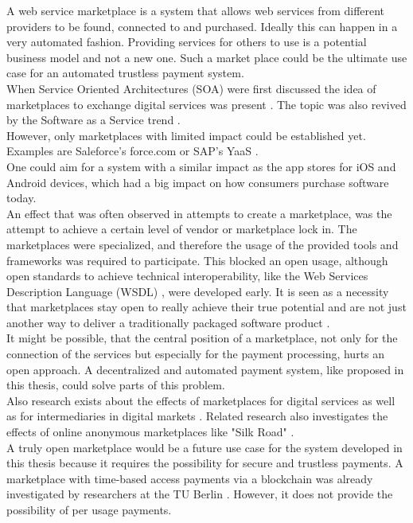 \documentclass[a4paper,12pt]{scrartcl}
\begin{document}
A web service marketplace is a system that allows web services from different providers to be found, connected to and purchased. Ideally this can happen in a very automated fashion. Providing services for others to use is a potential business model and not a new one. Such a market place could be the ultimate use case for an automated trustless payment system.\\
When Service Oriented Architectures (SOA) \cite{kart2009managing} were first discussed the idea of marketplaces to exchange digital services was present \cite{Hartmanis2007a}\cite{Papazoglou2003}. The topic was also revived by the Software as a Service \cite{Kumar2017} trend \cite{Cusumano2010} \cite{turner2003turning}.\\
However, only marketplaces with limited impact could be established yet. Examples are Saleforce's force.com \cite{web58}\cite{Weissman2009} or SAP's YaaS \cite{web59}.\\
One could aim for a system with a similar impact as the app stores for iOS and Android devices, which had a big impact on how consumers purchase software today.\\
An effect that was often observed in attempts to create a marketplace, was the attempt to achieve a certain level of vendor or marketplace lock in. The marketplaces were specialized, and therefore the usage of the provided tools and frameworks was required to participate. This blocked an open usage, although open standards to achieve technical interoperability, like the Web Services Description Language (WSDL) \cite{web64}, were developed early. It is seen as a necessity that marketplaces stay open to really achieve their true potential and are not just another way to deliver a traditionally packaged software product \cite{Cusumano2010}.\\
It might be possible, that the central position of a marketplace, not only for the connection of the services but especially for the payment processing, hurts an open approach. A decentralized and automated payment system, like proposed in this thesis, could solve parts of this problem.\\
Also research exists about the effects of marketplaces for digital services \cite{Schlauderer2011} as well as for intermediaries in digital markets \cite{Giaglis2002}. Related research also investigates the effects of online anonymous marketplaces \cite{Soska2015} like "Silk Road" \cite{web68}.\\

A truly open marketplace would be a future use case for the system developed in this thesis because it requires the possibility for secure and trustless payments. A marketplace with time-based access payments via a blockchain was already investigated by researchers at the TU Berlin \cite{klems2017trustless}. However, it does not provide the possibility of per usage payments.\\
\end{document}
